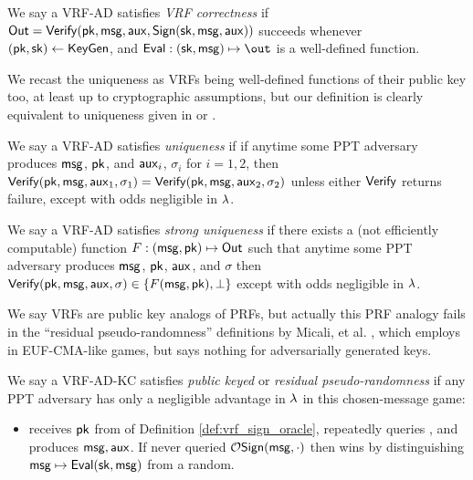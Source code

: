 \begin{definition}
We say a VRF-AD satisfies {\em VRF correctness} if
 ${\mathsf{Out}} = {\mathsf{Verify}}(\mathsf{pk},\mathsf{msg},\mathsf{aux},{\mathsf{Sign}}(\mathsf{sk},\mathsf{msg},\mathsf{aux}))$ succeeds
whenever $(\mathsf{pk},\mathsf{sk}) \leftarrow {\ensuremath{\mathsf{KeyGen}}}$, and
$\Eval : (\sk,\msg) \mapsto \out$ is a well-defined function.
\end{definition}

We recast the uniqueness as VRFs being well-defined functions of
their public key too, at least up to cryptographic assumptions,
but our definition is clearly equivalent to uniqueness given in
\cite[Def. 2 \S3.2, pp. 4]{vrf_micali} or \cite[Def. 3, pp. 8]{agg_dgk}.

\begin{definition}
We say a VRF-AD satisfies {\em uniqueness} if
if anytime some PPT adversary \adv produces $\mathsf{msg}$, $\mathsf{pk}$, and $\mathsf{aux}_i$, $\sigma_i$ for $i=1,2$, then
${\mathsf{Verify}}(\mathsf{pk},\mathsf{msg},\mathsf{aux}_1,\sigma_1) = {\mathsf{Verify}}(\mathsf{pk},\mathsf{msg},\mathsf{aux}_2,\sigma_2)$
unless either ${\mathsf{Verify}}$ returns failure, except with odds negligible in $\lambda$.
\end{definition}

\begin{definition}
We say a VRF-AD satisfies {\em strong uniqueness} if
there exists a (not efficiently computable) function
 $F : (\mathsf{msg},\mathsf{pk}) \mapsto {\ensuremath{\mathsf{Out}}}$ such that
anytime some PPT adversary \adv produces $\mathsf{msg}$, $\mathsf{pk}$, $\mathsf{aux}$, and $\sigma$
then ${\mathsf{Verify}}(\mathsf{pk},\mathsf{msg},\mathsf{aux},\sigma) \in \{ F(\mathsf{msg},\mathsf{pk}), \perp \}$
except with odds negligible in $\lambda$.
\end{definition}

We say VRFs are public key analogs of PRFs, but actually this PRF analogy
fails in the ``residual pseudo-randomness'' definitions by
Micali, et al. \cite[Def. VRF (3) \S3.2, pp. 4]{vrf_micali},
 which employs  in EUF-CMA-like games,
 but says nothing for adversarially generated keys.

\begin{definition}
We say a VRF-AD-KC satisfies {\em public keyed} or {\em residual pseudo-randomness} if 
any PPT adversary \adv has only a negligible advantage in $\lambda$
in this chosen-message game:
\begin{itemize}
	\item[]
	\adv receives $\mathsf{pk}$ from  of Definition \ref{def:vrf_sign_oracle},
	repeatedly queries , and produces $\mathsf{msg},\mathsf{aux}$.
	If \adv never queried $\mathcal{O}\mathsf{Sign}(\mathsf{msg},\cdot)$ then
	\adv wins by distinguishing $\mathsf{msg} \mapsto {\ensuremath{\mathsf{Eval}}}(\mathsf{sk},\mathsf{msg})$ from a random.
\end{itemize}
\end{definition}

